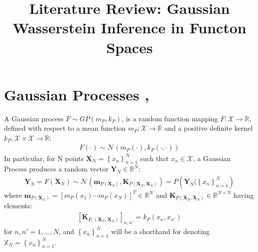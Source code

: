\documentclass[twoside,11pt]{article}
\begin{document}
\title{Literature Review: Gaussian Wasserstein Inference in Functon Spaces}
\maketitle
\section{Gaussian Processes \cite{wild2022generalized}, \cite{wild2023connections}}
A Gaussian process $F \sim GP(m_P, k_P)$, is a random function mapping $F: \mathcal{X} \rightarrow \mathbb{R}$, defined with respect to a mean function $m_P: \mathcal{X} \rightarrow \mathbb{R}$ and a positive definite kernel $k_P: \mathcal{X} \times \mathcal{X} \rightarrow \mathbb{R}$:
\begin{align}
    F(\cdot) \sim \mathcal{N}(m_P(\cdot), k_P(\cdot, \cdot))
    \label{gp}
\end{align}
In particular, for N points $\mathbf{X}_N = \left\{ x_n\right\}_{n=1}^N$ such that $x_n \in \mathcal{X}$, a Gaussian Process produces a random vector $\mathbf{Y}_N \in \mathbb{R}^{N}$:
\begin{align}
    \label{gp-vector}
    \mathbf{Y}_N = F(\mathbf{X}_N) \sim  \mathcal{N}(\mathbf{m}_{P(\mathbf{X}_N)}, \mathbf{K}_{P(\mathbf{X}_N, \mathbf{X}_N)}) = P\left(\mathbf{Y}_N \Big\vert \left\{ x_n\right\}_{n=1}^N\right)
\end{align}
where $\mathbf{m}_{P(\mathbf{X}_N)} = \left[ m_P(x_1) \cdots m_P(x_N)\right]^T \in \mathbb{R}^N$ and $\mathbf{K}_{P(\mathbf{X}_N, \mathbf{X}_N)} \in \mathbb{R}^{N \times N}$ having elements:
\begin{align}
    \left[\mathbf{K}_{P,(\mathbf{X}_N, \mathbf{X}_N)}\right]_{n, n'} = k_P(x_n, x_{n'})
\end{align}
for $n, n'=1,\dots, N$, and $\left\{ x_n\right\}_{n=1}^N$ will be a shorthand for denoting $\mathbb{X}_N = \left\{ x_n\right\}_{n=1}^N$.
\end{document}
